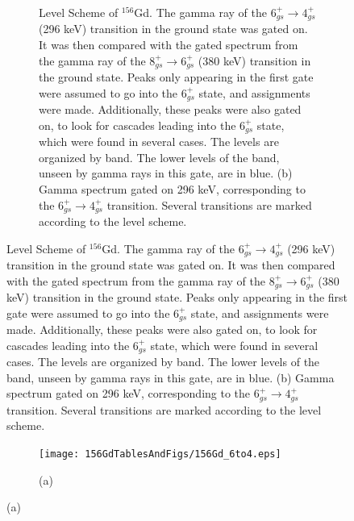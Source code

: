\begin{landscape}
\begin{figure}[!]
    \centering
    \label{fig:156_6to4}
    \begin{subfigure}{1.4\textwidth}
    \caption{\centering \fontsize{10pt}{12pt}Level Scheme of $^{156}$Gd. The gamma ray of the $6^+_{gs}\rightarrow 4^+_{gs}$ (296 keV) transition in the ground state was gated on. It was then compared with the gated spectrum from the gamma ray of the $8^+_{gs}\rightarrow 6^+_{gs}$ (380 keV) transition in the ground state. Peaks only appearing in the first gate were assumed to go into the $6^+_{gs}$ state, and assignments were made. Additionally, these peaks were also gated on, to look for cascades leading into the $6^+_{gs}$ state, which were found in several cases. The levels are organized by band. The lower levels of the band, unseen by gamma rays in this gate, are in blue. (b) Gamma spectrum gated on 296 keV, corresponding to the $6^+_{gs}\rightarrow 4^+_{gs}$ transition. Several transitions are marked according to the level scheme.}
    \end{subfigure}
\end{figure}
\clearpage
\begin{figure}
    \ContinuedFloat
    \begin{subfigure}{1.4\textwidth}
    \texttt{[image: 156GdTablesAndFigs/156Gd\_6to4.eps]}
    \caption*{(a)}
    \label{fig:156_6to4level}
    \end{subfigure}
    \end{figure}
    \end{landscape}
